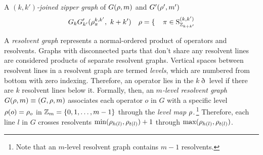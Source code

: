 \documentclass[11pt]{article}
\numberwithin{equation}{section}
\begin{document}
\begin{dfn}
\label{dfn:resolvent-graph}
A \textit{$(k,k')$-joined zipper graph} of $G(\rho ,m)$ and $G'(\rho ',m')$ 
\begin{align}
  G_k
  G_{k'}'
  (
    \rh_\pi^{k,k'},\
    k+k'
  )
&&
  \rh
=
\left\{
\begin{array}{r@{\ }l}
\end{array}
\right.
&&
  \pi
\in
  \mr{S}_{\mb{Z}_{k+k'}}^{(k,k')}
\end{align}
\end{dfn}

\begin{dfn}
\label{dfn:insertion-graph}
\end{dfn}

\begin{dfn}\label{dfn:resolvent-graph}
A \textit{resolvent graph} represents a normal-ordered product of operators and resolvents.
Graphs with disconnected parts that don't share any resolvent lines are considered products of separate resolvent graphs.
Vertical spaces between resolvent lines in a resolvent graph are termed \textit{levels}, which are numbered from bottom with zero indexing.
Therefore, an operator lies in the $k\eth$ level if there are $k$ resolvent lines below it.
Formally, then, an \textit{$m$-level resolvent graph} $G(\rho ,m)\equiv(G,\rho ,m)$ associates each operator $o$ in $G$ with a specific level $\rho (o)=\rho _o$ in $\mathbb{Z}_m=\{0,1,\ldots,m-1\}$ through the \textit{level map} $\rho $.\,\footnote{
  Note that an $m$-level resolvent graph contains $m-1$ resolvents.
}
Therefore, each line $l$ in $G$ crosses resolvents
$
  \mathrm{min}(\rho _{h(l)},\rho _{t(l)}) + 1
$
through
$
  \mathrm{max}(\rho _{h(l)},\rho _{t(l)})
$.
\end{dfn}
\end{document}
